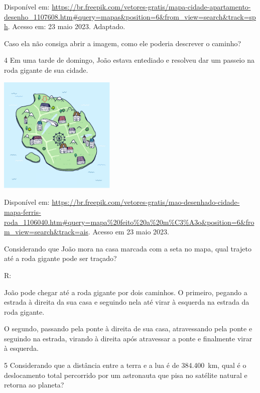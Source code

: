 {Disponível em:
\url{https://br.freepik.com/vetores-gratis/mapa-cidade-apartamento-desenho_1107608.htm\#query=mapas\&position=6\&from_view=search\&track=sph}.
Acesso em: 23 maio 2023. Adaptado.

Caso ela não consiga abrir a imagem, como ele poderia descrever o
caminho?


\num{4} Em uma tarde de domingo, João estava entediado e resolveu dar um
passeio na roda gigante de sua cidade.

\includegraphics[width=2.2in,height=2.2in]{./imgSAEB_8_MAT/media/image38.png}

Disponível em:
\url{https://br.freepik.com/vetores-gratis/mao-desenhado-cidade-mapa-ferris-roda_1106040.htm\#query=mapa\%20feito\%20a\%20m\%C3\%A3o\&position=6\&from_view=search\&track=ais}.
Acesso em 23 maio 2023.

Considerando que João mora na casa marcada com a seta no mapa, qual
trajeto até a roda gigante pode ser traçado?

R:

João pode chegar até a roda gigante por dois caminhos. O primeiro,
pegando a estrada à direita da sua casa e seguindo nela até virar à
esquerda na estrada da roda gigante.

O segundo, passando pela ponte à direita de sua casa, atravessando pela
ponte e seguindo na estrada, virando à direita após atravessar a ponte e
finalmente virar à esquerda.

\num{5} Considerando que a distância entre a terra e a lua é de 384.400~km,
qual é o deslocamento total percorrido por um astronauta que pisa no
satélite natural e retorna ao planeta?


}
